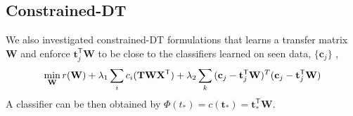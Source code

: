 \subsection{Constrained-DT}
We also investigated constrained-DT formulations that learns a transfer matrix $\mathbf{W}$ and  enforce $\mathbf{t}_j^\textsf{T}\mathbf{W}$ to be close to the classifiers learned on seen data, $\{\mathbf{c}_j \}$ ,\ie
\[\small \min_{\mathbf{W}}  r(\mathbf{W}) + \lambda_1 \sum_i c_i(\mathbf{T} \mathbf{W} \mathbf{X}^\textsf{T}) +\lambda_2 \sum_k{(\mathbf{c}_j - \mathbf{t}^\textsf{T}_j \mathbf{W})^T (\mathbf{c}_j - \mathbf{t}^\textsf{T}_j \mathbf{W})}
\]
A classifier can be then obtained by ${\Phi (t_*)}  =c(\mathbf{t}_*)= \mathbf{t}_*^\textsf{T}\mathbf{W}$.

\begin{comment}

\begin{equation}
\small
\begin{split}
 {\Phi (t_*)} = \small \hat{c}(\mathbf{t}_*) =   \underset{\mathbf{c},\zeta_i}{\operatorname{argmin }}[    \mathbf{c}^\textsf{T} \mathbf{c} - \alpha {\mathbf{t}_*}^\textsf{T} \mathbf{W} \mathbf{c}  - \gamma  
 \ln p_{reg}(\mathbf{c}|\mathbf{t}_*)
  \\ +\gamma   \sum_{i=1}^N{\zeta_i} ]\, ; s.t.:  -\mathbf{c}^\textsf{T} {\mathbf{x}}_{i}  \geq \zeta_i , \; \zeta_i \geq 0 , \; {\mathbf{t}_*}^\textsf{T} \mathbf{W} \mathbf{c} \geq l 
 \label{Eq:Opt1}
 \end{split}
 \end{equation}
The first term is a regularizer over the classifier $\mathbf{c}$.  The second term enforces that the predicted classifier has high correlation with $\mathbf{t}_*^\textsf{T} \mathbf{W}$. The third term favors a classifier that aligns with the prediction of the regressor $\tilde{c}(\mathbf{t}_*)$. The constraints $\mathbf{c}^\textsf{T} {\mathbf{x}}_{i} \geq \zeta_i $  enforce that all  seen data instances are at the negative side of the predicted hyperplane with some missclassification allowed through the  slack variables $ \zeta_i$. The constraint $ {\mathbf{t}_*}^\textsf{T} \mathbf{W} \mathbf{c} \geq l$ enforces that the correlation between the predicted classifier and ${\mathbf{t}_*}^\textsf{T} \mathbf{W}$ is no less than $l$, \ie a minimum correlation between the text and visual features. 
Given $\mathbf{W}$, and the form of the probability estimate $ p_{reg}(\mathbf{c}|\mathbf{t}_*)$, the optimization reduces to a quadratic program on $\mathbf{c}$ with linear constraints.
\end{comment}

